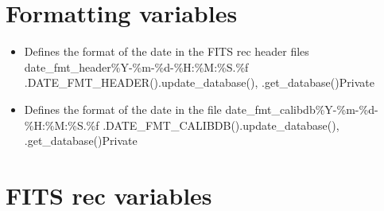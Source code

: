 \fi

\ifdevguide
\clearpage
\newpage
\section{Formatting variables}
\label{ch:variables:formatting}

\begin{itemize}

\item {}
{Defines the format of the date in the FITS rec header files}
{date\_fmt\_header}{\%Y-\%m-\%d-\%H:\%M:\%S.\%f}
{\spirouCDB}{\spirouConst.DATE\_FMT\_HEADER()}{\spirouCDB.update\_database(), \spirouCDB.get\_database()}{Private}


\item {}
{Defines the format of the date in the \calibdb file}
{date\_fmt\_calibdb}{\%Y-\%m-\%d-\%H:\%M:\%S.\%f}
{\spirouCDB}{\spirouConst.DATE\_FMT\_CALIBDB()}{\spirouCDB.update\_database(), \spirouCDB.get\_database()}{Private}

\end{itemize}

\fi







\ifdevguide
\clearpage
\newpage
\section{FITS rec variables}
\label{ch:variables:fitsrec}


